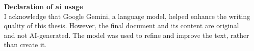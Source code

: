 \listoffigures  %
\listoftables   %

\newpage
\textbf{Declaration of \ac{ai} usage} \\
I acknowledge that Google Gemini, a language model, helped enhance the writing quality of this thesis. However, the final document and its content are original and not AI-generated. The model was used to refine and improve the text, rather than create it.


\clearpage  %